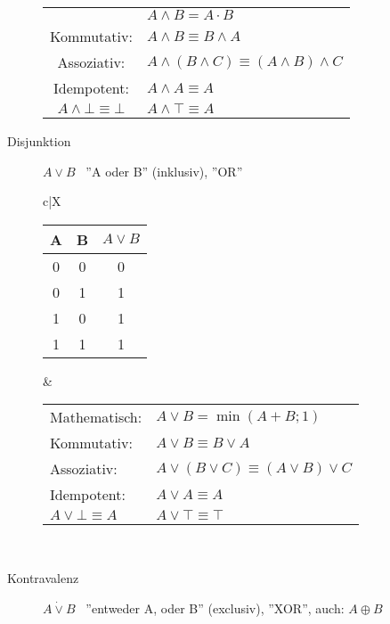 \begin{description}
\begin{description}
\begin{tabularx}{\linewidth}{c|X}
\begin{tabular}[t]{ll}
                Mathematisch:               & $A \wedge B = A \cdot B$                             \\
                Kommutativ:                 & $A \wedge B \equiv B \wedge A$                       \\
                Assoziativ:                 & $A \wedge (B \wedge C) \equiv (A \wedge B) \wedge C$ \\
                Idempotent:                 & $A \wedge A \equiv A$                                \\
                $A \wedge \bot \equiv \bot$ & $A \wedge \top \equiv A$
            \end{tabular} \\ \hline
        \end{tabularx}
        \item[Disjunktion] $A\vee B$ \, ''A oder B'' (inklusiv), ''OR'' \\
        \begin{tabularx}{\linewidth}{c|X}
            \begin{tabular}[t]{c|c||c}
                A & B & $A \vee B$ \\ \hline\hline
                0 & 0 & 0          \\ \hline
                0 & 1 & 1          \\ \hline
                1 & 0 & 1          \\ \hline
                1 & 1 & 1
            \end{tabular} &
            \begin{tabular}[t]{ll}
                Mathematisch:           & $A \vee B = \min(A+B;1)$                     \\
                Kommutativ:             & $A \vee B \equiv B \vee A$                   \\
                Assoziativ:             & $A \vee (B \vee C) \equiv (A \vee B) \vee C$ \\
                Idempotent:             & $A \vee A \equiv A$                          \\
                $A \vee \bot \equiv A $ & $A \vee \top \equiv \top$
            \end{tabular} \\ \hline
        \end{tabularx}
        \item[Kontravalenz] $A\dot{\vee}B$ \, ''entweder A, oder B'' (exclusiv), ''XOR'', auch: $A\oplus B$ \\

\end{description}
\end{description}
